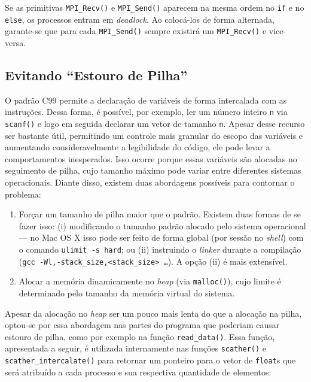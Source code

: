 \documentclass[12pt,a4paper]{article}
\begin{document}
Se as primitivas \texttt{MPI\_Recv()} e \texttt{MPI\_Send()} aparecem na mesma
ordem no \texttt{if} e no \texttt{else}, os processos entram em
\textit{deadlock}. Ao colocá-los de forma alternada, garante-se que para cada
\texttt{MPI\_Send()} sempre existirá um \texttt{MPI\_Recv()} e vice-versa.


\subsection{Evitando ``Estouro de Pilha''}
O padrão C99 permite a declaração de variáveis de forma intercalada com as
instruções. Dessa forma, é possível, por exemplo, ler um número inteiro
\texttt{n} via \texttt{scanf()} e logo em seguida declarar um vetor de tamanho
\texttt{n}. Apesar desse recurso ser bastante útil, permitindo um controle mais
granular do escopo das variáveis e aumentando consideravelmente a legibilidade
do código, ele pode levar a comportamentos inesperados. Isso ocorre porque essas
variáveis são alocadas no seguimento de pilha, cujo tamanho máximo pode variar
entre diferentes sistemas operacionais. Diante disso, existem duas abordagens
possíveis para contornar o problema:

\begin{enumerate}
    \item Forçar um tamanho de pilha maior que o padrão. Existem duas formas de
    se fazer isso: (i) modificando o tamanho padrão alocado pelo sistema
    operacional --- no Mac OS X isso pode ser feito de forma global (por sessão
    no \textit{shell}) com o comando \texttt{ulimit -s hard}; ou (ii) instruindo
    o \textit{linker} durante a compilação (\texttt{gcc
    -Wl,-stack\_size,<stack\_size> \ldots}). A opção (ii) é mais extensível. 
    \item Alocar a memória dinamicamente no \textit{heap} (via
    \texttt{malloc()}), cujo limite é determinado pelo tamanho da memória
    virtual do sistema.
\end{enumerate}

Apesar da alocação no \textit{heap} ser um pouco mais lenta do que a alocação na
pilha, optou-se por essa abordagem nas partes do programa que poderiam causar
estouro de pilha, como por exemplo na função \texttt{read\_data()}. Essa função,
apresentada a seguir, é utilizada internamente nas funções \texttt{scather()} e
\texttt{scather\_intercalate()} para retornar um ponteiro para o vetor de
\texttt{float}s que será atribuído a cada processo e sua respectiva quantidade
de elementos:
\end{document}
